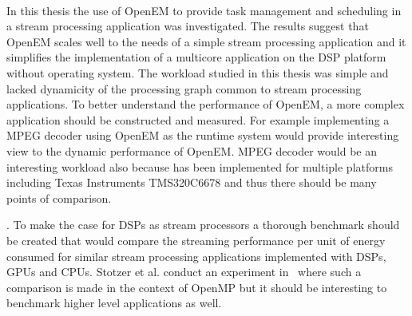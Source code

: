  \\
In this thesis the use of OpenEM to provide task management and scheduling in a stream processing application was investigated. The results suggest that OpenEM scales well to the needs of a simple stream processing application and it simplifies the implementation of a multicore application on the DSP platform without operating system. The workload studied in this thesis was simple and lacked dynamicity of the processing graph common to stream processing applications. To better understand the performance of OpenEM, a more complex application should be constructed and measured. For example implementing a MPEG decoder using OpenEM as the runtime system would provide interesting view to the dynamic performance of OpenEM. MPEG decoder would be an interesting workload also because has been implemented for multiple platforms including Texas Instruments TMS320C6678 and thus there should be many points of comparison.

. To make the case for DSPs as stream processors a thorough benchmark should be created that would compare the streaming performance per unit of energy consumed for similar stream processing applications implemented with DSPs, GPUs and CPUs. Stotzer et al. conduct an experiment in~\cite{stotzer2013openmp} where such a comparison is made in the context of OpenMP but it should be interesting to benchmark higher level applications as well.
